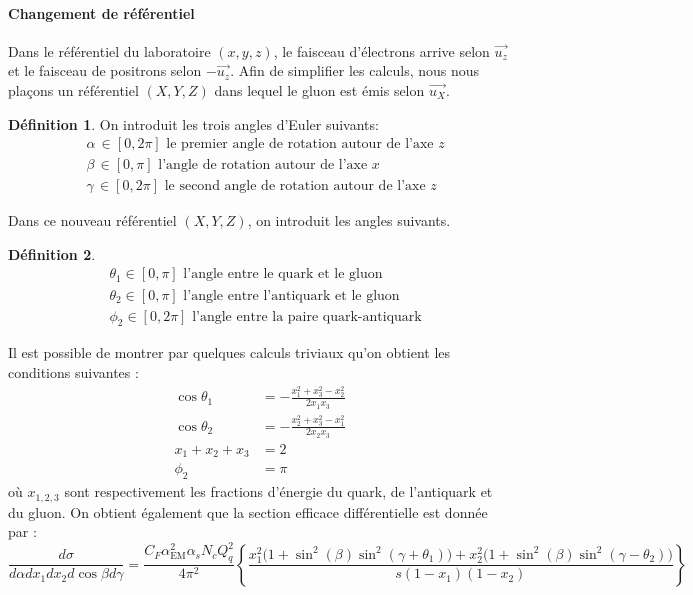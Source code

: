 \documentclass[a4paper]{article} %
\numberwithin{equation}{section} %
\theoremstyle{definition}
\newtheorem{definition}{Définition}[section]
\theoremstyle{remark}
\theoremstyle{plain}%
\theoremstyle{style_exemple}
\newenvironment{formal_def}{%
  \def\FrameCommand{%
    \hspace{0pt}%
    {\color{OliveGreen}\vrule width 2pt}%
    {\color{defshade}\vrule width 4pt}%
    \colorbox{defshade}%
  }%
  \MakeFramed{\advance\hsize-\width\FrameRestore}%
  \noindent\hspace{-4.55pt}%
  \begin{adjustwidth}{}{7pt}%
  \vspace{2pt}\vspace{2pt}%
}
{%
  \vspace{2pt}\end{adjustwidth}\endMakeFramed%
}
\newcommand{\coldef}[1]{\begin{formal_def}
    \begin{definition}
        #1
    \end{definition}
\end{formal_def}}
\begin{document}
\paragraph{Changement de référentiel}
Dans le référentiel du laboratoire $(x,y,z)$, le faisceau d'électrons arrive selon $\Vec{u_z}$ et le faisceau de positrons selon $-\Vec{u_z}$. Afin de simplifier les calculs, nous nous plaçons un référentiel $(X,Y,Z)$ dans lequel le gluon est émis selon $\Vec{u_X}$.
\coldef{
On introduit les trois angles d'Euler suivants:
\begin{align*}
    &\alpha \, \in [0, 2 \pi ]\text{ le premier angle de rotation autour de l'axe } z \\
    &\beta \, \in [0,  \pi ]\text{ l'angle de rotation autour de l'axe } x \\
    &\gamma \, \in [0, 2 \pi ]\text{ le second angle de rotation autour de l'axe } z 
\end{align*}
}
Dans ce nouveau référentiel $(X,Y,Z)$, on introduit les angles suivants.
\coldef{
\begin{align*}
    &\theta_1 \in [0, \pi ] \text{ l'angle entre le quark et le gluon}\\
    &\theta_2 \in [0, \pi ] \text{ l'angle entre l'antiquark et le gluon}\\
    &\phi_2 \in [0, 2 \pi ]\text{ l'angle entre la paire quark-antiquark}
\end{align*}
}
Il est possible de montrer \cite{Sol_ee-qqg} par quelques calculs triviaux qu'on obtient les conditions suivantes :
\begin{align}
    \cos \theta_1 &= - \frac{x_1^2 + x_3^2 - x_2^2}{2x_1 x_3} \label{eq:costheta1}\\
    \cos \theta_2 &= - \frac{x_2^2 + x_3^2 - x_1^2}{2x_2 x_3} \label{eq:costheta2}\\
    x_1 + x_2 + x_3 &= 2 \label{condition_xi}\\
    \phi_2 &= \pi
\end{align}
où $x_{1,2,3}$ sont respectivement les fractions d'énergie du quark, de l'antiquark et du gluon. On obtient également que la section efficace différentielle est donnée par :
\begin{equation}\label{section_efficace}
    \frac{d\sigma}{d\alpha dx_1 dx_2 d \cos \beta d \gamma} = \frac{C_F \alpha_\text{EM}^2 \alpha_s N_c Q_q^2}{4 \pi^2}\left\{ 
    \frac{x_1^2 \big( 1 + \sin^2(\beta) \sin^2 (\gamma + \theta_1) \big) + x_2^2 \big( 1 + \sin^2(\beta) \sin^2 (\gamma - \theta_2) \big)}{s (1- x_1)(1 - x_2)}
    \right\}
\end{equation}
\end{document}

